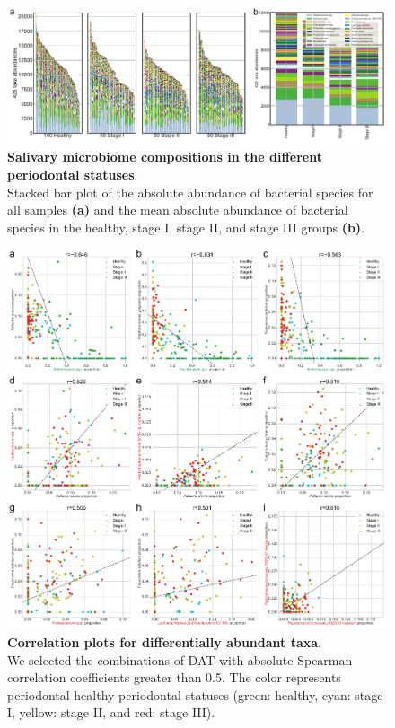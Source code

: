 \documentclass[11pt, a4paper, onecolumn, oneside]{report}
\begin{document}
            \begin{figure}[p]
                \centering
                \includegraphics[width=\linewidth]{Figures/Periodontitis/Figure_S2.pdf}
                \caption[Salivary microbiome compositions in the different periodontal statuses]{\textbf{Salivary microbiome compositions in the different periodontal statuses}. \\
                    Stacked bar plot of the absolute abundance of bacterial species for all samples \textbf{(a)} and the mean absolute abundance of bacterial species in the healthy, stage I, stage II, and stage III groups \textbf{(b)}.}
                \label{fig:Periodontitis-abundance}
            \end{figure}
            \clearpage

            \begin{figure}[p]
                \centering
                \includegraphics[width=\linewidth]{Figures/Periodontitis/Figure_S3.pdf}
                \caption[Correlation plots for differentially abundant taxa]{\textbf{Correlation plots for differentially abundant taxa}. \\
                    We selected the combinations of DAT with absolute Spearman correlation coefficients greater than 0.5. The color represents periodontal healthy periodontal statuses (green: healthy, cyan: stage I, yellow: stage II, and red: stage III).}
                \label{fig:Periodontitis-correlation2}
            \end{figure}
            \clearpage
\end{document}
